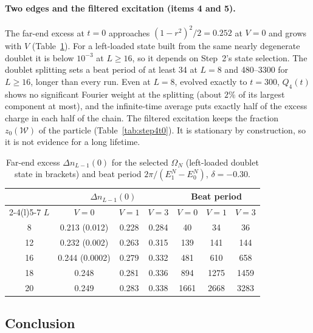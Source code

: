 \documentclass[11pt,a4paper]{article}
\begin{document}
\paragraph{Two edges and the filtered excitation (items 4 and 5).} The far-end excess at $t=0$ approaches $(1-r^2)^2/2=0.252$ at $V=0$ and grows with $V$ (Table~\ref{tab:step4edges}). For a left-loaded state built from the same nearly degenerate doublet it is below $10^{-3}$ at $L\ge16$, so it depends on Step~2's state selection. The doublet splitting sets a beat period of at least 34 at $L=8$ and 480--3300 for $L\ge16$, longer than every run. Even at $L=8$, evolved exactly to $t=300$, $Q_4(t)$ shows no significant Fourier weight at the splitting (about $2\%$ of its largest component at most), and the infinite-time average puts exactly half of the excess charge in each half of the chain. The filtered excitation keeps the fraction $z_0(\mathcal{W})$ of the particle (Table~\ref{tab:step4t0}). It is stationary by construction, so it is not evidence for a long lifetime.

\begin{table}[htbp]
\centering\small
\begin{tabular}{@{}c ccc ccc@{}}
\toprule
 & \multicolumn{3}{c}{$\Delta n_{L-1}(0)$} & \multicolumn{3}{c}{Beat period}\\
\cmidrule(lr){2-4}\cmidrule(l){5-7}
$L$ & $V=0$ & $V=1$ & $V=3$ & $V=0$ & $V=1$ & $V=3$\\
\midrule
8  & 0.213 (0.012) & 0.228 & 0.284 & 40   & 34   & 36\\
12 & 0.232 (0.002) & 0.263 & 0.315 & 139  & 141  & 144\\
16 & 0.244 (0.0002) & 0.279 & 0.332 & 481  & 610  & 658\\
18 & 0.248 & 0.281 & 0.336 & 894  & 1275 & 1459\\
20 & 0.249 & 0.283 & 0.338 & 1661 & 2668 & 3283\\
\bottomrule
\end{tabular}
\caption{Far-end excess $\Delta n_{L-1}(0)$ for the selected $\Omega_N$ (left-loaded doublet state in brackets) and beat period $2\pi/(E_1^N-E_0^N)$, $\delta=-0.30$.}
\label{tab:step4edges}
\end{table}

\subsection{Conclusion}
\end{document}
